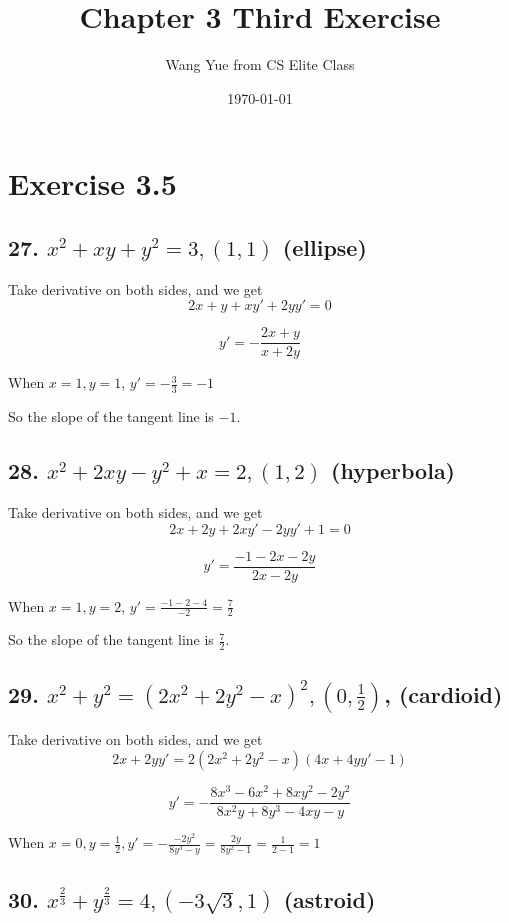 \documentclass{article}
\begin{document}
    \title{Chapter 3 Third Exercise}
    \author{Wang Yue from CS Elite Class}
    \date{\today}

    \maketitle

    \section*{Exercise 3.5}

    \subsection*{27. $x^2 + xy + y^2 = 3, (1,1)$ (ellipse)}

    Take derivative on both sides, and we get $$2x + y + xy' + 2yy' = 0$$

    $$y' = -\frac{2x + y}{x + 2y}$$

    When $x = 1, y = 1$, $y' = -\frac{3}{3} = -1$

    So the slope of the tangent line is $-1$.

    \subsection*{28. $x^2 + 2xy - y^2 + x = 2, (1, 2)$ (hyperbola)}

    Take derivative on both sides, and we get $$2x + 2y + 2xy' - 2yy' + 1 = 0$$

    $$y' = \frac{-1 - 2x - 2y}{2x - 2y}$$

    When $x = 1, y = 2$, $y' = \frac{-1 -2 -4}{-2} = \frac 7 2$

    So the slope of the tangent line is $\frac 7 2$.

    \subsection*{29. $x^2 + y^2 = (2x^2 + 2y^2 - x)^2, (0, \frac 1 2)$, (cardioid)}

    Take derivative on both sides, and we get $$2x + 2yy' = 2(2x^2 + 2y^2 - x)(4x + 4yy' - 1)$$

    $$y' = -\frac{8x^3 - 6x^2 + 8xy^2 - 2y^2}{8x^2y + 8y^3 - 4xy - y}$$

    When $x = 0, y = \frac 1 2, y' = -\frac{-2y^2}{8y^3 - y} = \frac{2y}{8y^2 - 1} = \frac{1}{2 - 1} = 1$

    \subsection*{30. $x^{\frac 2 3} + y^{\frac 2 3} = 4, (-3\sqrt 3, 1)$ (astroid)}
\end{document}
